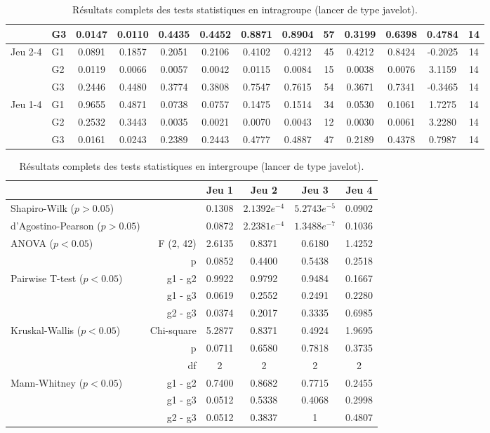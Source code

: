{\begin{landscape}
\begin{table}[H]
\begin{tabular}{ll|cc|ccccc|cccc}
 & G3 & 0.0147 & 0.0110 & 0.4435 & 0.4452 & 0.8871 & 0.8904 & 57 & 0.3199 & 0.6398 & 0.4784 & 14 \\\hline
\multirow{3}{*}{Jeu 2-4} & G1 & 0.0891 & 0.1857 & 0.2051 & 0.2106 & 0.4102 & 0.4212 & 45 & 0.4212 & 0.8424 & -0.2025 & 14 \\
 & G2 & 0.0119 & 0.0066 & 0.0057 & 0.0042 & 0.0115 & 0.0084 & 15 & 0.0038 & 0.0076 & 3.1159 & 14 \\
 & G3 & 0.2446 & 0.4480 & 0.3774 & 0.3808 & 0.7547 & 0.7615 & 54 & 0.3671 & 0.7341 & -0.3465 & 14 \\\hline
\multirow{3}{*}{Jeu 1-4} & G1 & 0.9655 & 0.4871 & 0.0738 & 0.0757 & 0.1475 & 0.1514 & 34 & 0.0530 & 0.1061 & 1.7275 & 14 \\
 & G2 & 0.2532 & 0.3443 & 0.0035 & 0.0021 & 0.0070 & 0.0043 & 12 & 0.0030 & 0.0061 & 3.2280 & 14 \\
 & G3 & 0.0161 & 0.0243 & 0.2389 & 0.2443 & 0.4777 & 0.4887 & 47 & 0.2189 & 0.4378 & 0.7987 & 14
\end{tabular}
\caption{Résultats complets des tests statistiques en intragroupe (lancer de type javelot).}
\end{table}
\end{landscape}}

\begin{table}[H]
\begin{tabular}{lr|cccc}
& & Jeu 1 & Jeu 2 & Jeu 3 & Jeu 4 \\\hline
Shapiro-Wilk ($p > 0.05$) & & 0.1308 & $2.1392e^{-4}$ & $5.2743e^{-5}$ & 0.0902 \\
d'Agostino-Pearson ($p > 0.05$) &  & 0.0872 & $2.2381e^{-4}$ & $1.3488e^{-7}$ & 0.1036 \\\hline
\multirow{2}{*}{ANOVA ($p < 0.05$)} & F (2, 42) & 2.6135 & 0.8371 & 0.6180 & 1.4252 \\
 & p & 0.0852 & 0.4400 & 0.5438 & 0.2518 \\\hline
\multirow{3}{*}{Pairwise T-test ($p < 0.05$)} & g1 - g2 & 0.9922 & 0.9792 & 0.9484 & 0.1667 \\
 & g1 - g3 & 0.0619 & 0.2552 & 0.2491 & 0.2280 \\
 & g2 - g3 & 0.0374 & 0.2017 & 0.3335 & 0.6985 \\\hline
\multirow{3}{*}{Kruskal-Wallis ($p < 0.05$)} & Chi-square & 5.2877 & 0.8371 & 0.4924 & 1.9695 \\
 & p & 0.0711 & 0.6580 & 0.7818 & 0.3735 \\
 & df & 2 & 2 & 2 & 2 \\\hline
\multirow{3}{*}{Mann-Whitney ($p < 0.05$)} & g1 - g2 & 0.7400 & 0.8682 & 0.7715 & 0.2455 \\
 & g1 - g3 & 0.0512 & 0.5338 & 0.4068 & 0.2998 \\
 & g2 - g3 & 0.0512 & 0.3837 & 1 & 0.4807
\end{tabular}
\caption{Résultats complets des tests statistiques en intergroupe (lancer de type javelot).}
\end{table}

